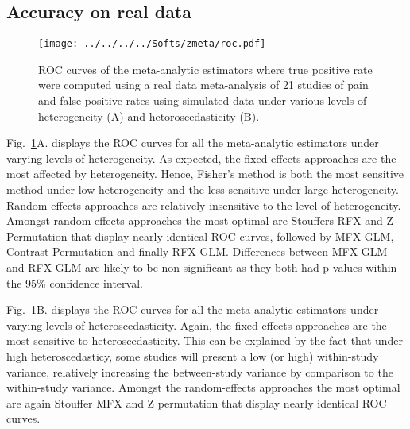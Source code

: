 \documentclass[preprint]{elsarticle}
\begin{document}
\subsection{Accuracy on real data}
\begin{figure}[h]
	\centering
 	\texttt{[image: ../../../../Softs/zmeta/roc.pdf]}
	\caption{ROC curves of the meta-analytic estimators where true positive rate were computed using a real data meta-analysis of 21 studies of pain and false positive rates using simulated data under various levels of heterogeneity (A) and hetoroscedasticity (B).}
	\label{fig_realdata}
\end{figure}


Fig.~\ref{fig_realdata}A. displays the ROC curves for all the meta-analytic estimators under varying levels of heterogeneity. As expected, the fixed-effects approaches are the most affected by heterogeneity. Hence, Fisher's method is both the most sensitive method under low heterogeneity and the less sensitive under large heterogeneity. Random-effects approaches are relatively insensitive to the level of heterogeneity. Amongst random-effects approaches the most optimal are Stouffers RFX and Z Permutation that display nearly identical ROC curves, followed by MFX GLM, Contrast Permutation and finally RFX GLM. Differences between MFX GLM and RFX GLM are likely to be non-significant as they both had p-values within the 95\% confidence interval.

Fig.~\ref{fig_realdata}B. displays the ROC curves for all the meta-analytic estimators under varying levels of heteroscedasticity. Again, the fixed-effects approaches are the most sensitive to heteroscedasticity. This can be explained by the fact that under high heteroscedasticy, some studies will present a low (or high) within-study variance, relatively increasing the between-study variance by comparison to the within-study variance. Amongst the random-effects approaches the most optimal are again Stouffer MFX and Z permutation that display nearly identical ROC curves. 

\end{document}

